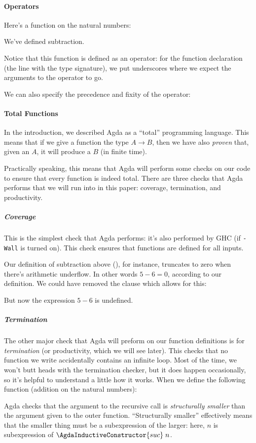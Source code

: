 \paragraph{Operators}
Here's a function on the natural numbers:
\begin{agdalisting} \label{sub-def}
\end{agdalisting}
We've defined subtraction.

Notice that this function is defined as an operator: for the function
declaration (the line with the type signature), we put underscores where we
expect the arguments to the operator to go.

We can also specify the precedence and fixity of the operator:
\begin{agdalisting*}
\end{agdalisting*}
\paragraph{Total Functions}
In the introduction, we described Agda as a ``total'' programming language.
This means that if we give a function the type \(A \rightarrow B\), then we have
also \emph{proven} that, given an \(A\), it will produce a \(B\) (in finite
time).

Practically speaking, this means that Agda will perform some checks on our
code to ensure that every function is indeed total.
There are three checks that Agda performs that we will run into in this paper:
coverage, termination, and productivity.
\subparagraph{Coverage}
This is the simplest check that Agda performs: it's also performed by GHC (if
\verb+-Wall+ is turned on).
This check ensures that functions are defined for all inputs.

Our definition of subtraction above (), for instance,
truncates to zero when there's arithmetic underflow.
In other words \(5 - 6 = 0\), according to our definition.
We could have removed the clause which allows for this:
\begin{agdalisting*}
\end{agdalisting*}
But now the expression \(5 - 6\) is undefined.
\subparagraph{Termination}
The other major check that Agda will preform on our function definitions is for
\emph{termination} (or productivity, which we will see later).
This checks that no function we write accidentally contains an infinite loop.
Most of the time, we won't butt heads with the
termination checker, but it does happen occasionally, so it's helpful to
understand a little how it works. When we define the following function
(addition on the natural numbers):
\begin{agdalisting} \label{add-def}
\end{agdalisting}
Agda checks that the argument to the recursive call is \emph{structurally
  smaller} than the argument given to the outer function.
``Structurally smaller'' effectively means that the smaller thing must be a
subexpression of the larger: here, \(n\) is subexpression of
\(\AgdaInductiveConstructor{suc}\;n\).


